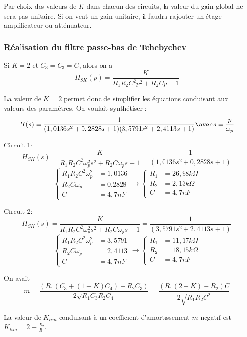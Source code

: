 \documentclass[../../Cours_M1.tex]{subfiles}
\begin{document}
Par choix des valeurs de $K$ dans chacun des circuits, la valeur du gain global ne sera pas unitaire. Si on veut un gain unitaire, il faudra rajouter un étage amplificateur ou atténuateur.

\subsubsection{Réalisation du filtre passe-bas de Tchebychev}

Si $K=2$ et $C_3=C_3=C$, alors on a
\[H_{SK}(p) = \frac{K}{R_1R_2C^2p^2 + R_2Cp+1}\]

La valeur de $K=2$ permet donc de simplifier les équations conduisant aux valeurs des paramètres.
On voulait synthétiser :
\[H(s) = \frac{1}{(1,0136s^2 + 0,2828s +1)(3,5791s^2 + 2,4113s+1)} \avec s = \frac{p}{\omega_p}\]

Circuit 1:\\
\[H_{SK}(s) = \frac{K}{R_1R_2C^2\omega_p^2s^2+R_2C\omega_ps+1}
=\frac{1}{(1,0136s^2 + 0,2828s +1)}\]
\[
\left\{
\begin{array}{ll}
R_1R_2C^2\omega_p^2 & = 1,0136 \\
R_2C\omega_p & = 0.2828 \\
C & = 4,7 nF
\end{array}
\right.
\rightarrow
\left\{
\begin{array}{ll}
R_1 & = 26,98k\Omega \\
R_2 & = 2,13 k\Omega \\
C & = 4,7 nF
\end{array}
\right.
\]

Circuit 2:\\
\[H_{SK}(s) = \frac{K}{R_1R_2C^2\omega_p^2s^2+R_2C\omega_ps+1}
=\frac{1}{(3,5791s^2 + 2,4113s +1)}\]
\[
\left\{
\begin{array}{ll}
R_1R_2C^2\omega_p^2 & = 3,5791 \\
R_2C\omega_p & = 2,4113 \\
C & = 4,7 nF
\end{array}
\right.
\rightarrow
\left\{
\begin{array}{ll}
R_1 & = 11,17k\Omega \\
R_2 & = 18,15k\Omega \\
C & = 4,7 nF
\end{array}
\right.
\]

On avait \[m = \frac{(R_1(C_3+(1-K)C_4)+R_2C_3)}{2\sqrt{R_1C_3R_2C_4}} = \frac{(R_1(2-K) + R_2)C}{2\sqrt{R_1R_2C^2}}\]

La valeur de $K_{lim}$ conduisant à un coefficient d'amortissement $m$ négatif est $K_{lim} = 2+ \frac{R_2}{R_1}$.\\
\end{document}
